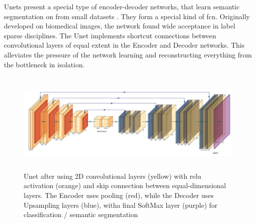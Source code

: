 Unets present a special type of encoder-decoder networks, that learn semantic segmentation on from small datasets \citep{ronneberger2015unet}. They form a special kind of \ac{fcn}. Originally developed on biomedical images, the network found wide acceptance in label sparse disciplines. The Unet implements shortcut connections between convolutional layers of equal extent in the Encoder and Decoder networks. This alleviates the pressure of the network learning and reconstructing everything from the bottleneck in isolation. 

\begin{figure}
    \centering
    \includegraphics[width=\textwidth,height=5cm,keepaspectratio]{figures/unet.pdf}
    \caption{Unet after \citet{ronneberger2015unet} using 2D convolutional layers (yellow) with \ac{relu} activation (orange) and skip connection between equal-dimensional layers. The Encoder uses pooling (red), while the Decoder uses Upsampling layers (blue), witha final SoftMax layer (purple) for classification / semantic segmentation}
    \label{fig:unet}
\end{figure}